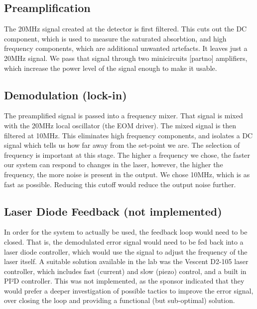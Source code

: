 \subsection{Preamplification}

The 20MHz signal created at the detector is first filtered.  This cuts out the DC component, which is used to measure the saturated absorbtion, and high frequency components, which are additional unwanted artefacts.  It leaves just a 20MHz signal.  We pass that signal through two minicircuits [partno] amplifiers, which increase the power level of the signal enough to make it usable.

\subsection{Demodulation (lock-in)}

The preamplified signal is passed into a frequency mixer.  That signal is mixed with the 20MHz local oscillator (the EOM driver).  The mixed signal is then filtered at 10MHz.  This eliminates high frequency components, and isolates a DC signal which tells us how far away from the set-point we are.  The selection of frequency is important at this stage.  The higher a frequency we chose, the faster our system can respond to changes in the laser, however, the higher the frequency, the more noise is present in the output.  We chose 10MHz, which is as fast as possible.  Reducing this cutoff would reduce the output noise further.

\subsection{Laser Diode Feedback (not implemented)}

In order for the system to actually be used, the feedback loop would need to be closed.  That is, the demodulated error signal would need to be fed back into a laser diode controller, which would use the signal to adjust the frequency of the laser itself.  A suitable solution available in the lab was the Vescent D2-105 laser controller, which includes fast (current) and slow (piezo) control, and a built in PI²D controller.  This was not implemented, as the sponsor indicated that they would prefer a deeper investigation of possible tactics to improve the error signal, over closing the loop and providing a functional (but sub-optimal) solution.

